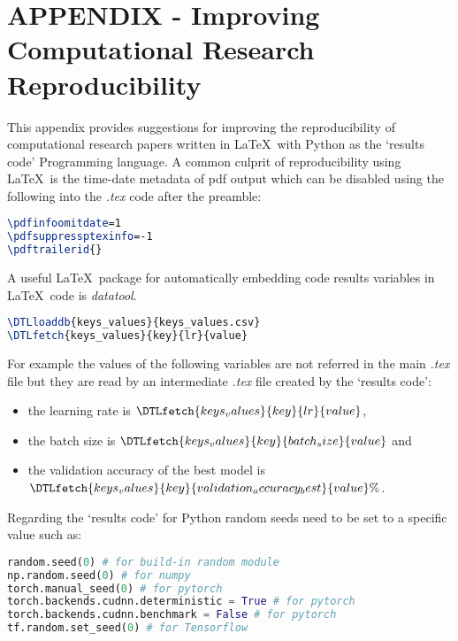 \documentclass[journal]{IEEEtran}
\begin{document}
\section{APPENDIX - Improving Computational Research Reproducibility}
This appendix provides suggestions for improving the reproducibility of computational research papers written in \LaTeX\ with Python as the `results code' Programming language.
A common culprit of reproducibility using \LaTeX\ is the time-date metadata of pdf output which can be disabled using the following into the \textit{.tex} code after the preamble:
\begin{lstlisting}[language=TeX, style=lststyle, caption={\LaTeX\ pdf reproducibility commands for preamble.}, captionpos=b]
\pdfinfoomitdate=1
\pdfsuppressptexinfo=-1
\pdftrailerid{}
\end{lstlisting}

A useful \LaTeX\ package for automatically embedding code results variables in \LaTeX\ code is \textit{datatool}.
\begin{lstlisting}[language=TeX, style=lststyle, caption={\LaTeX\ datatool example of loading a file that contains pairs of keys and values (keys\_values.csv) generated by a `results code' and getting the value of a key named lr.}, captionpos=b]
\DTLloaddb{keys_values}{keys_values.csv}
\DTLfetch{keys_values}{key}{lr}{value}
\end{lstlisting}

For example the values of the following variables are not referred in the main \textit{.tex} file but they are read by an intermediate \textit{.tex} file created by the `results code':
\begin{itemize}
	\item the learning rate is $\DTLfetch{keys_values}{key}{lr}{value}$,
	\item the batch size is $\DTLfetch{keys_values}{key}{batch_size}{value}$ and
	\item the validation accuracy of the best model is $\DTLfetch{keys_values}{key}{validation_accuracy_best}{value}\%$.
\end{itemize}

Regarding the `results code' for Python random seeds need to be set to a specific value such as:
\begin{lstlisting}[language=python, style=lststyle, caption={Python reproducibility commands for some popular libraries.}, captionpos=b]
random.seed(0) # for build-in random module
np.random.seed(0) # for numpy
torch.manual_seed(0) # for pytorch
torch.backends.cudnn.deterministic = True # for pytorch
torch.backends.cudnn.benchmark = False # for pytorch
tf.random.set_seed(0) # for Tensorflow
\end{lstlisting}
\end{document}
